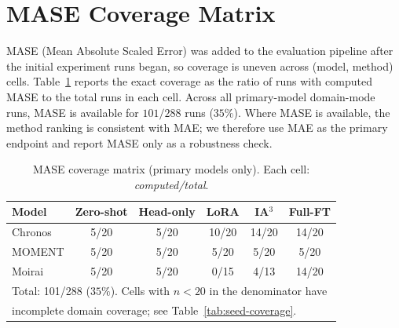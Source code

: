\section{MASE Coverage Matrix}
\label{sec:mase}
MASE (Mean Absolute Scaled Error) was added to the evaluation pipeline after the initial experiment runs began, so coverage is uneven across (model, method) cells. Table~\ref{tab:mase-coverage} reports the exact coverage as the ratio of runs with computed MASE to the total runs in each cell. Across all primary-model domain-mode runs, MASE is available for $101/288$ runs ($35\%$). Where MASE is available, the method ranking is consistent with MAE; we therefore use MAE as the primary endpoint and report MASE only as a robustness check.

\begin{table}[ht]
\centering
\caption{MASE coverage matrix (primary models only). Each cell: \emph{computed/total}.}
\label{tab:mase-coverage}
\small
\begin{tabular}{lccccc}
\toprule
Model & Zero-shot & Head-only & LoRA & IA$^3$ & Full-FT \\
\midrule
Chronos & 5/20 & 5/20  & 10/20 & 14/20 & 14/20 \\
MOMENT  & 5/20 & 5/20  & 5/20  & 5/20  & 5/20 \\
Moirai  & 5/20 & 5/20  & 0/15  & 4/13  & 14/20 \\
\bottomrule
\multicolumn{6}{l}{\scriptsize Total: 101/288 ($35\%$). Cells with $n{<}20$ in the denominator have} \\
\multicolumn{6}{l}{\scriptsize incomplete domain coverage; see Table~\ref{tab:seed-coverage}.} \\
\end{tabular}
\end{table}

